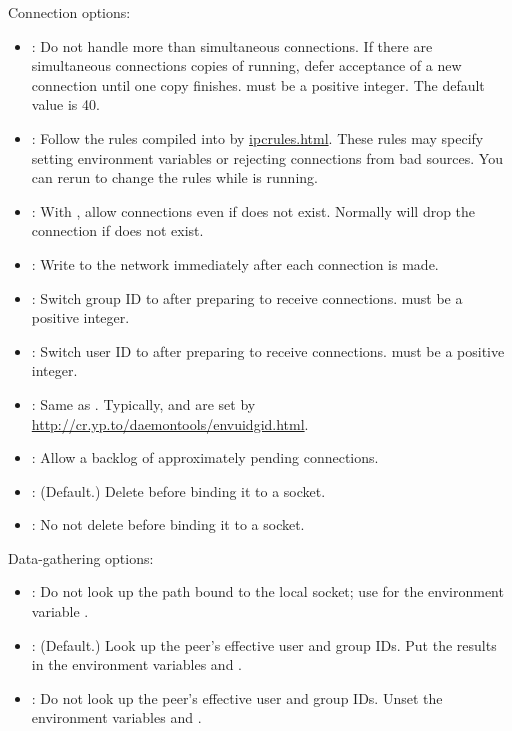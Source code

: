 \documentclass{book}
\begin{document}
Connection options:
\begin{itemize}
\item {}:  Do not handle more than  simultaneous
  connections.  If there are  simultaneous connections
  copies of  running, defer acceptance of a new
  connection until one copy finishes.   must be a positive
  integer.  The default value is 40.

\item {}: Follow the rules compiled into  by
  \href{\cmd{ipcrules}}{ipcrules.html}.  These rules may specify setting
  environment variables or rejecting connections from bad sources.
  You can rerun  to change the rules while
   is running.

\item {}: With , allow connections even if 
  does not exist.  Normally  will drop the
  connection if  does not exist.

\item {}: Write  to the network
  immediately after each connection is made.

\item {}: Switch group ID to  after preparing
  to receive connections.   must be a positive integer.

\item {}: Switch user ID to  after preparing
  to receive connections.   must be a positive integer.

\item {}: Same as .  Typically,  and
   are set by
  \href{\cmd{envuidgid}}{http://cr.yp.to/daemontools/envuidgid.html}.

\item {}: Allow a backlog of approximately 
  pending connections.

\item {}: (Default.) Delete  before binding it to a socket.

\item {}: No not delete  before binding it to a socket.
\end{itemize}

Data-gathering options:
\begin{itemize}
\item {}: Do not look up the path bound to the local socket;
use  for the environment variable .

\item {}: (Default.) Look up the peer's effective user and group
IDs.  Put the results in the environment variables 
and .

\item {}: Do not look up the peer's effective user and group
IDs.  Unset the environment variables 
and .
\end{itemize}
\end{document}
